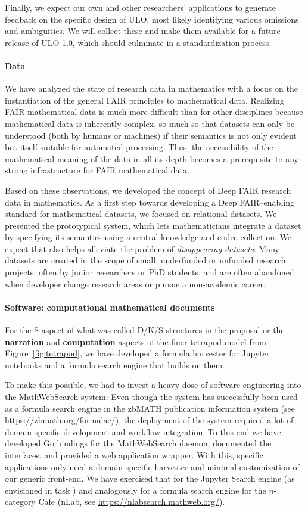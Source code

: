 Finally, we expect our own and other researchers' applications to generate feedback on the specific design of ULO, most likely identifying various omissions and ambiguities.
We will collect these and make them available for a future release of ULO 1.0, which should culminate in a standardization process.

\paragraph{Data}
We have analyzed the state of research data in mathematics with a focus on the instantiation of the general FAIR principles to mathematical data.
Realizing FAIR mathematical data is much more difficult than for other disciplines because mathematical data is inherently complex, so much so that datasets can only be understood (both by humans or machines) if their semantics is not only evident but itself suitable for automated processing.
Thus, the accessibility of the mathematical meaning of the data in all its depth becomes a prerequisite to any strong infrastructure for FAIR mathematical data.

Based on these observations, we developed the concept of Deep FAIR research data in mathematics.
As a first step towards developing a Deep FAIR--enabling standard for mathematical datasets, we focused on relational datasets.
We presented the prototypical \dmh system, which lets mathematicians integrate a dataset by specifying its semantics using a central knowledge and codec collection.
We expect that \dmh also helps alleviate the problem of \emph{disappearing datasets}:
Many datasets are created in the scope of small, underfunded or unfunded research projects, often by junior researchers or PhD students, and are often abandoned when developer change research areas or pursue a non-academic career.

\paragraph{Software: computational mathematical documents}
For the S aspect of what was called D/K/S-structures in the \pn proposal or the \textbf{narration} and \textbf{computation} aspects of the finer tetrapod model from Figure~\ref{fig:tetrapod}, we have developed a formula harvester for Jupyter notebooks and a formula search engine that builds on them.

To make this possible, we had to invest a heavy dose of software engineering into the MathWebSearch system: Even though the system has successfully been used as a formula search engine in the zbMATH publication information system (see \url{https://zbmath.org/formulae/}), the deployment of the system required a lot of domain-specific development and workflow integration.
To this end we have developed Go bindings for the MathWebSearch daemon, documented the interfaces, and provided a web application wrapper.
With this, specific applications only need a domain-specific harvester and minimal customization of our generic front-end. 
We have exercised that for the Jupyter Search engine (as envisioned in task ) and analogously for a formula search engine for the $n$-category Cafe (nLab, see \url{https://nlabsearch.mathweb.org/}).


